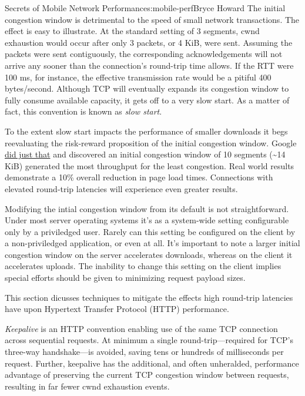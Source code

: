 \begin{aosachapter}{Secrets of Mobile Network Performance}{s:mobile-perf}{Bryce Howard}
The initial congestion window is detrimental to the speed of small
network transactions. The effect is easy to illustrate. At the standard
setting of 3 segments, cwnd exhaustion would occur after only 3 packets,
or 4 KiB, were sent. Assuming the packets were sent contiguously, the
corresponding acknowledgements will not arrive any sooner than the
connection's round-trip time allows. If the RTT were 100 ms, for
instance, the effective transmission rate would be a pitiful 400
bytes/second. Although TCP will eventually expands its congestion window
to fully consume available capacity, it gets off to a very slow start.
As a matter of fact, this convention is known as \emph{slow start}.

To the extent slow start impacts the performance of smaller downloads it
begs reevaluating the risk-reward proposition of the initial congestion
window. Google \href{http://research.google.com/pubs/pub36640.html}{did
just that} and discovered an initial congestion window of 10 segments
(\textasciitilde{}14 KiB) generated the most throughput for the least
congestion. Real world results demonstrate a 10\% overall reduction in
page load times. Connections with elevated round-trip latencies will
experience even greater results.

Modifying the intial congestion window from its default is not
straightforward. Under most server operating systems it's as a
system-wide setting configurable only by a priviledged user. Rarely can
this setting be configured on the client by a non-priviledged
application, or even at all. It's important to note a larger initial
congestion window on the server accelerates downloads, whereas on the
client it accelerates uploads. The inability to change this setting on
the client implies special efforts should be given to minimizing request
payload sizes.


This section dicusses techniques to mitigate the effects high round-trip
latencies have upon Hypertext Transfer Protocol (HTTP) performance.


\emph{Keepalive} is an HTTP convention enabling use of the same TCP
connection across sequential requests. At minimum a single
round-trip---required for TCP's three-way handshake---is avoided, saving
tens or hundreds of milliseconds per request. Further, keepalive has the
additional, and often unheralded, performance advantage of preserving
the current TCP congestion window between requests, resulting in far
fewer cwnd exhaustion events.


\end{aosachapter}
